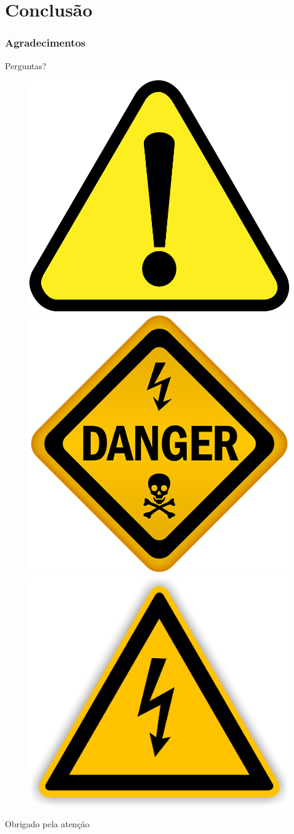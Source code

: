 \documentclass[12pt]{beamer}
\begin{document}
\section{Conclusão}
\begin{frame}
    \frametitle{Agradecimentos}
    \centering
    \Huge{Perguntas?}
    \begin{figure}
        \centering
        \includegraphics[width=.3\textwidth]{alerta.png}
        \includegraphics[width=.3\textwidth]{perigo.png}
        \includegraphics[width=.3\textwidth]{eletricidade.png}
    \end{figure}
    \Huge{Obrigado pela atenção}
\end{frame}
\end{document}
